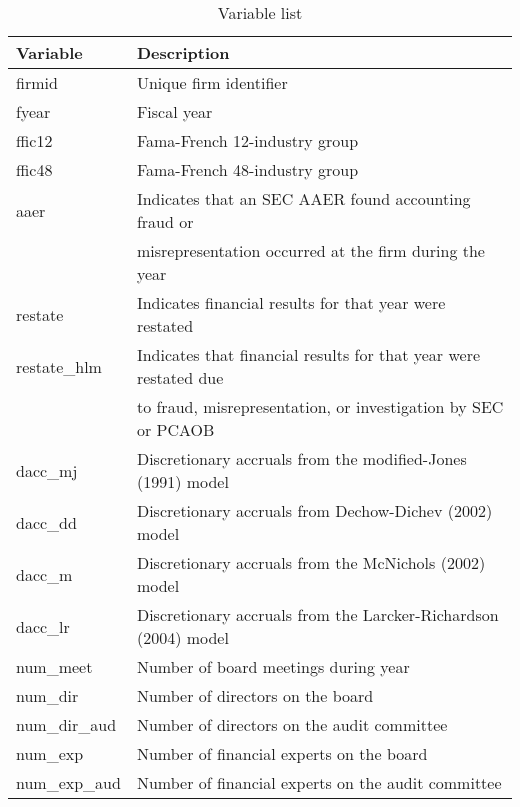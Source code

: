 \documentclass[11pt]{amsart}
\theoremstyle{definition}
\theoremstyle{question}
\begin{document}
\begin{table}[h]
\caption{Variable list} \label{tab:vars}
    \begin{tabular}{ll}
\textbf{    Variable} & \textbf{Description } \\
    \hline
        firmid & Unique firm identifier \\
        fyear     &    Fiscal year \\
        ffic12     &Fama-French 12-industry group  \\
        ffic48     &    Fama-French 48-industry group \\
        aaer       &    Indicates that an SEC AAER found accounting fraud or  \\
        & misrepresentation occurred at the firm during the year \\
        restate    &    Indicates financial results for that year were restated \\
        restate\_hlm    & Indicates that financial results for that year were restated due \\
        & to fraud,     misrepresentation, or investigation by SEC or PCAOB \\
        dacc\_mj & Discretionary accruals from the modified-Jones (1991) model \\
        dacc\_dd  &    Discretionary accruals from Dechow-Dichev (2002) model \\
        dacc\_m & Discretionary accruals from the McNichols (2002) model \\
        dacc\_lr &    Discretionary accruals from the Larcker-Richardson (2004) model \\
        num\_meet    & Number of board meetings during year \\
        num\_dir &     Number of directors on the board \\
        num\_dir\_aud & Number of directors on the audit committee \\
        num\_exp  & Number of financial experts on the board \\
        num\_exp\_aud &     Number of financial experts on the audit committee \\
\end{tabular}    
\end{table}


\end{document}
